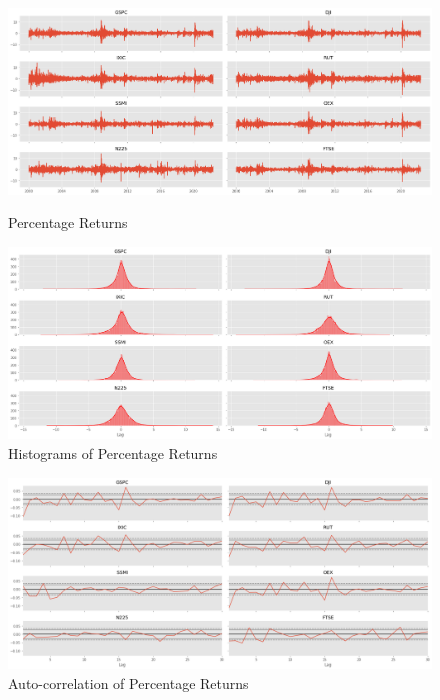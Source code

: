 \documentclass[a4paper, oneside]{discothesis}
\begin{document}
\begin{figure}\
    \centering
    \includegraphics[width = 13cm]{figures/RETURNS.png}
    \caption{Percentage Returns}
    \label{fig:1d_rets}
\end{figure}
\begin{figure}
    \centering
    \includegraphics[width = 13cm]{figures/HISTOGRAMMS.png}
    \caption{Histograms of Percentage Returns}
    \label{fig:1d_hists}
\end{figure}
\begin{figure}
    \centering
    \includegraphics[width = 13cm]{figures/AUTOCORRELATIONS.png}
    \caption{Auto-correlation of Percentage Returns}
    \label{fig:1d_auto}
\end{figure}
\end{document}
